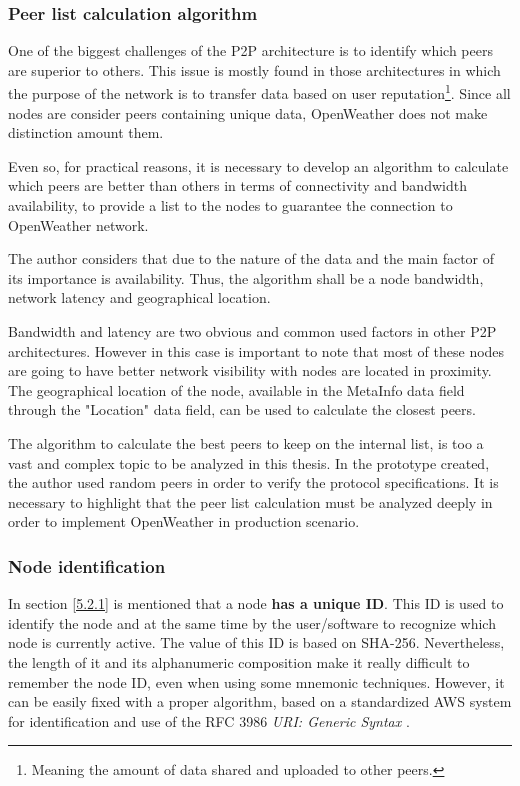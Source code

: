 \subsubsection{Peer list calculation algorithm}

One of the biggest challenges of the \gls{P2P} architecture is to identify which peers are superior to others. This issue is mostly found in those architectures in which the purpose of the network is to transfer data based on user reputation\footnote{Meaning the amount of data shared and uploaded to other peers.}. Since all nodes are consider peers containing unique data, OpenWeather does not make distinction amount them.

Even so, for practical reasons, it is necessary to develop an algorithm to calculate which peers are better than others in terms of connectivity and bandwidth availability, to provide a list to the nodes to guarantee the connection to OpenWeather network. 

The author considers that due to the nature of the data and the main factor of its importance is availability. Thus, the algorithm shall be a node bandwidth, network latency and geographical location.

Bandwidth and latency are two obvious and common used factors in other \gls{P2P} architectures. However in this case is important to note that most of these nodes are going to have better network visibility with nodes are located in proximity. The geographical location of the node, available in the MetaInfo data field through the "Location" data field, can be used to calculate the closest peers.

The algorithm to calculate the best peers to keep on the internal list, is too a vast and complex topic to be analyzed in this thesis. In the prototype created, the author used random peers in order to verify the protocol specifications. It is necessary to highlight that the peer list calculation must be analyzed deeply in order to implement OpenWeather in production scenario.

\subsubsection{Node identification}

In section \ref{5.2.1} is mentioned that a node \textbf{has a unique ID}. This ID is used to identify the node and at the same time by the user/software to recognize which node is currently active. The value of this ID is based on \gls{SHA}-256\cite{SHA}. Nevertheless, the length of it and its alphanumeric composition make it really difficult to remember the node ID, even when using some mnemonic techniques. However, it can be easily fixed with a proper algorithm, based on a standardized \gls{AWS} system for identification and use of the \gls{RFC} 3986 \emph{\gls{URI}: Generic Syntax} \cite{rfc3986}. 

